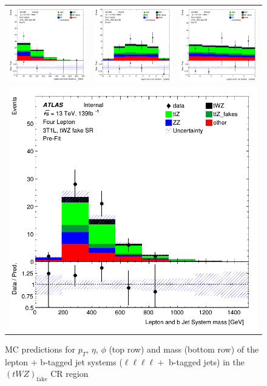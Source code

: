 \begin{figure}[htbp]
\centering
  \begin{tabular}{ccc}

    \includegraphics[width=.2\textwidth]{figures/PreFitPlots/lep4_tWZ_3T1L_bJets_Leps_sys_pt}&
    \includegraphics[width=.2\textwidth]{figures/PreFitPlots/lep4_tWZ_3T1L_bJets_Leps_sys_eta} &
    \includegraphics[width=.2\textwidth]{figures/PreFitPlots/lep4_tWZ_3T1L_bJets_Leps_sys_phi} \\
    \multicolumn{3}{c}{\includegraphics[width=.2\textwidth]{figures/PreFitPlots/lep4_tWZ_3T1L_bJets_Leps_sys_mass}}

  \end{tabular}
    \caption{MC predictions for $p_{T}$, $\eta$, $\phi$ (top row) and mass (bottom row) of the lepton $+$ b-tagged jet systems ($\ell \ell \ell \ell + $ b-tagged jets) in the $(tWZ)_{\text{fake}}$ CR region }
  \label{fig:4lep-3T1L-CR-bjet-and-leps-sys-Plots}
\end{figure}


